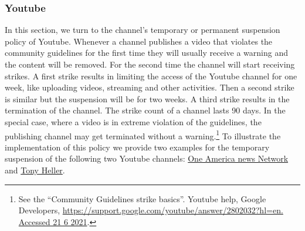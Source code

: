 \documentclass[11pt,a4paper]{article}
\begin{document}
\subsubsection{Youtube}

In this section, we turn to the channel's temporary or permanent suspension policy of Youtube. Whenever a channel publishes a video that violates the community guidelines for the first time they will  usually receive a warning and the content will be removed. For the second time the channel will start receiving strikes. A first strike results in limiting the access of the Youtube channel  for one week, like uploading videos, streaming and other activities. Then a second strike is similar but the suspension will be for two weeks. A third strike results in the termination of the channel. The strike count of a channel lasts 90 days.  In the special case, where a video is in extreme violation of the guidelines, the publishing channel may get terminated without a warning.\footnote{See the ``Community Guidelines strike basics''. Youtube help, Google Developers,  \href{https://support.google.com/youtube/answer/2802032?hl=en. Accessed 21 6 2021}{https://support.google.com/youtube/answer/2802032?hl=en. Accessed 21 6 2021}.} To illustrate the implementation of this policy we provide two examples for the temporary suspension of the following two Youtube channels: \href{https://www.youtube.com/channel/UCNbIDJNNgaRrXOD7VllIMRQ}{One America news Network} and \href{https://www.youtube.com/user/TonyHeller1}{Tony Heller}.

\smallskip
\end{document}
